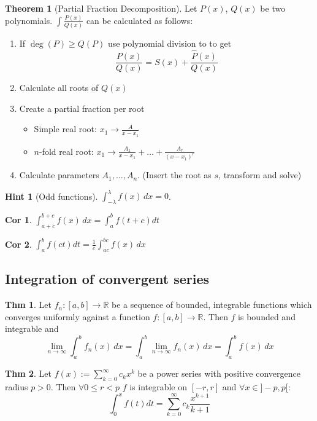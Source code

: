 \documentclass[a4paper, 10pt]{article}
\newtheorem*{corollary}{Cor}
\theoremstyle{definition}
\newtheorem*{theorem}{Thm}
\newtheorem*{note_wrapper}{Hint}
\theoremstyle{named}
\newtheorem*{ntheorem_wrapper}{Theorem}
\newenvironment{ntheorem}%
    {\begin{mdframed}[style=important]\begin{ntheorem_wrapper}}%
    {\end{ntheorem_wrapper}\end{mdframed}}
\newenvironment{note}%
    {\begin{mdframed}[style=trick]\begin{note_wrapper}}%
    {\end{note_wrapper}\end{mdframed}}
\newcommand{\R}{\mathbb{R}}
\begin{document}
\begin{ntheorem}[Partial Fraction Decomposition]
    Let $P(x)$, $Q(x)$ be two polynomials. $\int \frac{P(x)}{Q(x)}$ can be calculated as follows:
    \begin{enumerate}
        \item If $\deg(P) \geq Q(P)$ use polynomial division to to get
        $$\frac{P(x)}{Q(x)} = S(x) + \frac{\hat{P}(x)}{Q(x)}$$
        \item Calculate all roots of $Q(x)$
        \item Create a partial fraction per root
        \begin{itemize}
            \item Simple real root: $x_1 \to \frac{A}{x - x_1}$
            \item $n$-fold real root: $x_1 \to \frac{A_1}{x - x_1} + \ldots + \frac{A_r}{(x - x_1)^r}$
        \end{itemize}
        \item Calculate parameters $A_1, \ldots, A_n$. (Insert the root as $s$, transform and solve)
    \end{enumerate}
\end{ntheorem}

\begin{note}[Odd functions]
    $\int_{-\lambda}^\lambda f(x) \, dx = 0$.
\end{note}

\begin{corollary}
    $\int_{a + c}^{b + c} f(x) \,dx = \int_a^b f(t + c) dt$
\end{corollary}

\begin{corollary}
    $\int_a^b f(ct) dt = \frac{1}{c} \int_{ac}^{bc} f(x) \,dx$
\end{corollary}

\subsection{Integration of convergent series}
\begin{theorem}
    Let $f_n: [a, b] \to \R$ be a sequence of bounded, integrable functions which converges uniformly against a function $f: [a, b] \to \R$. Then $f$ is bounded and integrable and
    $$\lim_{n \to \infty} \int_a^b f_n(x) \,dx = \int_a^b \lim_{n \to \infty}  f_n(x) \,dx = \int_a^b f(x) \,dx$$
\end{theorem}

\begin{theorem}
    Let $f(x) := \sum_{k=0}^\infty c_k x^k$ be a power series with positive convergence radius $p > 0$. Then $\forall 0 \leq r < p$ $f$ is integrable on $[-r, r]$ and $\forall x \in ]-p, p[$:
    $$\int_0^x f(t) dt = \sum_{k=0}^\infty c_k \frac{x^{k + 1}}{k + 1}$$
\end{theorem}
\end{document}
